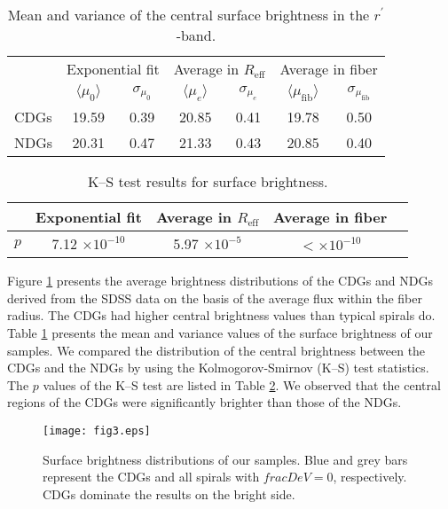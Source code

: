 \documentclass[fleqn,usenatbib]{mnras}
\begin{document}
\begin{table}
        \centering
        \caption{Mean and variance of the central surface brightness in the $r^{\prime}$-band.}
        \label{tab:table1}
        \begin{tabular}{lcccccc} 
                \hline
                & \multicolumn{2}{c}{Exponential fit} & \multicolumn{2}{c}{Average in $R_\mathrm{eff}$} & \multicolumn{2}{c}{Average in fiber }\\
                & $\langle \mu_0 \rangle$ & $\sigma_{\mu_0}$ & $\langle \mu_e \rangle$ & $\sigma_{\mu_e}$ & $\langle \mu_\mathrm{fib} \rangle$ & $\sigma_{\mu_\mathrm{fib}}$ \\
                \hline
                CDGs & 19.59 & 0.39 & 20.85 & 0.41 & 19.78 & 0.50\\
                NDGs & 20.31 & 0.47 & 21.33 & 0.43 & 20.85 & 0.40\\
                \hline
        \end{tabular}
\end{table}

\begin{table}
        \centering
        \caption{K--S test results for surface brightness.}
        \label{tab:table2}
        \begin{tabular}{lcccc} 
                \hline
                & Exponential fit & Average in $R_\mathrm{eff}$ & Average in fiber\\
                \hline
                $p$ & 7.12 $\times 10^{-10}$ & 5.97 $\times 10^{-5}$ & $<\times 10^{-10}$ \\
                \hline
        \end{tabular}
\end{table}

Figure \ref{fig3} presents the average brightness distributions of the CDGs and NDGs derived from the SDSS data on the basis of the average flux within the fiber radius.
The CDGs had higher central brightness values than typical spirals do.
Table \ref{tab:table1} presents the mean and variance values of the surface brightness of our samples.
We compared the distribution of the central brightness between the CDGs and the NDGs by using the Kolmogorov-Smirnov (K--S) test statistics.
The $p$ values of the K--S test are listed in Table \ref{tab:table2}.
We observed that the central regions of the CDGs were significantly brighter than those of the NDGs.
\begin{figure}
        \texttt{[image: fig3.eps]}
    \caption{Surface brightness distributions of our samples.
    Blue and grey bars represent the CDGs and all spirals with $fracDeV=0$, respectively.
    CDGs dominate the results on the bright side.}
    \label{fig3}
\end{figure}
\end{document}
